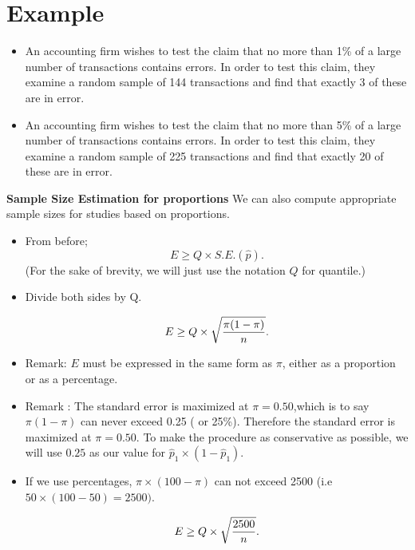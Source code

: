 \section{Example}
\begin{itemize}
\item An accounting firm wishes to test the claim that no more than 1\% of a large
number of transactions contains errors. In order to test this claim, they
examine a random sample of 144 transactions and find that exactly 3 of
these are in error.

\item An accounting firm wishes to test the claim that no more than 5\% of a large
number of transactions contains errors. In order to test this claim, they examine a
random sample of 225 transactions and find that exactly 20 of these are in error.
\end{itemize}









\noindent \textbf{Sample Size Estimation for proportions}
We can also compute appropriate sample sizes for studies based on proportions.
\begin{itemize}
\item From before; \[ E \geq Q \times S.E.(\hat{p}). \]
(For the sake of brevity, we will just use the notation $Q$ for quantile.)

\item Divide both sides by Q.

\[ E \geq Q \times \sqrt{ {\pi(1-\pi)  \over n} }. \]

\end{itemize}


\begin{itemize}
\item Remark: $E$ must be expressed in the same form as $\pi$, either as a proportion or as a percentage.
\item Remark : The standard error is maximized at $\pi = 0.50$,which is to say $\pi(1-\pi)$ can never exceed 0.25 ( or 25\%). Therefore the standard error is maximized at $\pi = 0.50$. To make the procedure as conservative as possible, we will use $0.25$ as our value for $\hat{p}_1 \times (1 - \hat{p}_1)$.
\item If we use percentages, $\pi \times (100-\pi)$ can not exceed 2500 (i.e $ 50 \times (100-50)=2500)$.

\[ E \geq Q \times \sqrt{{2500 \over n}}. \]


\end{itemize}


